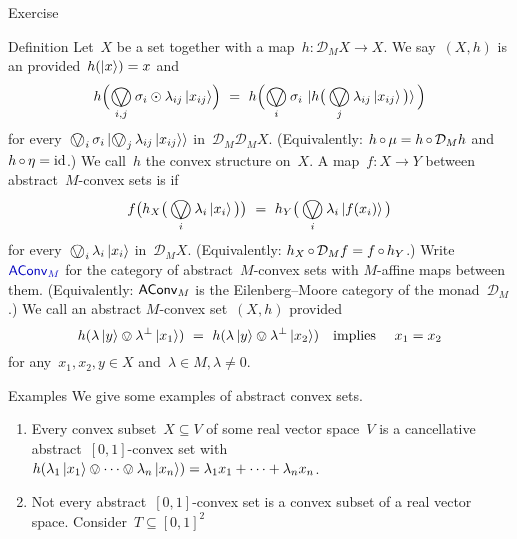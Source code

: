 \documentclass[b]{subfiles}
\begin{document}
\begin{parsec}
\begin{point}{Exercise}
\end{point}
\begin{point}{Definition}%
Let~$X$ be a set together
    with a map~$h\colon \mathcal{D}_M X \to X$.
We say~$(X,h)$ is an 
    provided~$h(\ket{x})=x$
    and
\begin{equation}\label{convex-mult}
    h \Bigl( \bigovee_{i,j} \sigma_i \odot \lambda_{ij} \ket{x_{ij}} \Bigr)
    \ = \ 
    h \Bigl( \bigovee_i \sigma_i \, \ket{
        h\bigl(\, \bigovee_j \lambda_{ij} \ket{x_{ij}}\, \bigr)
    } \, \Bigr)
\end{equation}
for every~$\bigovee_i \sigma_i \ket{\bigovee_j \lambda_{ij} \ket{x_{ij}}}$
    in~$\mathcal{D}_M \mathcal{D}_M X$.
(Equivalently: $h \mathop{\circ} \mu = h \mathop{\circ} \mathcal{D}_M h$
and~$h \mathop{\circ} \eta = \operatorname{id}$.)
    We call~$h$ the convex structure on~$X$.
A map~$f\colon X \to Y$
    between abstract~$M$-convex sets
    is  if
\begin{equation*}
    f \bigl(h_X \bigl(\,\bigovee_i \lambda_i \ket{x_i}\, \bigr)\bigr)
     \ = \ 
     h_Y\bigl(\,\bigovee_i \lambda_i \ket{f(x_i)}\,\bigr)
\end{equation*}
for every~$\bigovee_i \lambda_i \ket{x_i}$ in~$\mathcal{D}_M X$.
(Equivalently: $h_X \mathop{\circ} \mathcal{D}_M f = f \mathop{\circ} h_Y$.)
Write~$\Define{\AConvM}$ for the category
    of abstract~$M$-convex sets with
    $M$-affine maps between them.
(Equivalently: $\mathsf{AConv}_M$
    is the Eilenberg--Moore category
    of the monad~$\mathcal{D}_M$.)
We call an abstract $M$-convex set~$(X,h)$ 
provided
\begin{equation*}
    h(\lambda \ket{y} \ovee \lambda^\perp \ket{x_1})\  = \
    h(\lambda \ket{y} \ovee \lambda^\perp \ket{x_2})
    \quad\text{implies}\quad~x_1=x_2
\end{equation*}
    for any~$x_1,x_2,y \in X$ and~$\lambda \in M, \lambda \neq 0$.
\end{point}
\begin{point}{Examples}%
We give some examples of abstract convex sets.
\begin{enumerate}
\item
Every convex subset~$X \subseteq V$
    of some real vector space~$V$
    is a cancellative abstract~$[0,1]$-convex set
    with~$h(\lambda_1 \ket{x_1} \ovee \cdots \ovee \lambda_n \ket{x_n})
            = \lambda_1 x_1 + \cdots + \lambda_n x_n$.
\item
Not every abstract~$[0,1]$-convex set is
    a convex subset of a real vector space.
Consider~$T \subseteq [0,1]^2$

\end{enumerate}
\end{point}
\end{parsec}
\end{document}
